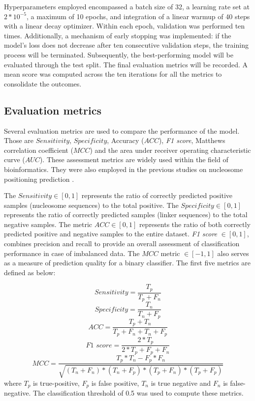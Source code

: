 \documentclass[a4paper,fleqn]{cas-dc}
\begin{document}
Hyperparameters employed encompassed a batch size of 32, a learning rate set at $2 * 10^{-5}$, a maximum of 10 epochs, and integration of a linear warmup of 40 steps with a linear decay optimizer. Within each epoch, validation was performed ten times. Additionally, a mechanism of early stopping was implemented: if the model's loss does not decrease after ten consecutive validation steps, the training process will be terminated. Subsequently, the best-performing model will be evaluated through the test split. The final evaluation metrics will be recorded. A mean score was computed across the ten iterations for all the metrics to consolidate the outcomes.


\subsection{Evaluation metrics}
Several evaluation metrics are used to compare the performance of the model. Those are $Sensitivity$, $Specificity$, Accuracy ($ACC$), \textit{F1 score}, Matthews correlation coefficient ($MCC$) and the area under receiver operating characteristic curve ($AUC$). These assessment metrics are widely used within the field of bioinformatics. They were also employed in the previous studies on nucleosome positioning prediction \cite{Zhang2018, Amato2020, Han2022}. 

The $Sensitivity \in [0,1]$ represents the ratio of correctly predicted positive samples (nucleosome sequences) to the total positive. The $Specificity \in [0,1]$ represents the ratio of correctly predicted samples (linker sequences) to the total negative samples. The metric $ACC \in [0,1]$ represents the ratio of both correctly predicted positive and negative samples to the entire dataset. \textit{F1 score} $\in [0,1]$, combines precision and recall to provide an overall assessment of classification performance in case of imbalanced data. The $MCC$ metric $\in [-1, 1]$ also serves as a measure of prediction quality for a binary classifier. The first five metrics are defined as below:

$$ Sensitivity = \frac{T_p}{T_p + F_n} $$
$$ Specificity = \frac {T_n}{T_n + F_p} $$
$$ ACC = \frac{T_p + T_n}{T_p + F_n + T_n + F_p} $$
$$ \textit{F1 score} = \frac{2 * T_p}{2* T_p + F_p + F_n} $$
$$ MCC = \frac{T_p * T_n - F_p * F_n}{\sqrt{(T_n + F_n) * (T_n + F_p) * (T_p + F_n) * (T_p + F_p)}} $$
where $T_p$ is true-positive, $F_p$ is false positive, $T_n$ is true negative and $F_n$ is false-negative. The classification threshold of 0.5 was used to compute these metrics.
\end{document}
